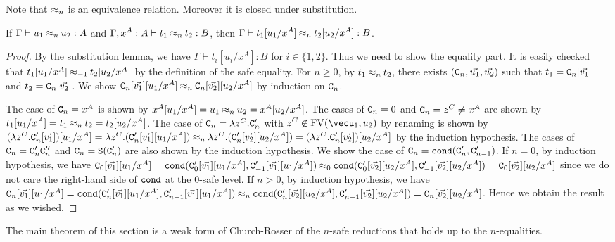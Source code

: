 Note that $\mathbin{\approx_{n}}$ is an equivalence relation. Moreover it is closed under substitution. 
\begin{lemma}\label{lem:nequal_subst}
  If $\Gamma \vdash u_1 \mathbin{\approx_{n}} u_2:A$ and $\Gamma, x^A:A \vdash t_1 \mathbin{\approx_{n}} t_2:B$, then
  $\Gamma \vdash t_1[u_1/x^A] \mathbin{\approx_{n}} t_2[u_2/x^A] :B$. 
\end{lemma}
\begin{proof}
  By the substitution lemma, we have $\Gamma \vdash t_i[u_i/x^A]: B$ for $i\in\{1,2\}$.
  Thus we need to show the equality part. 
  It is easily checked that $t_1[u_1/x^A] \mathbin{\approx_{-1}} t_2[u_2/x^A]$ by the definition of the safe equality.
  For $n\ge 0$, by $t_1\mathbin{\approx_{n}} t_2$, there exists $({\tt C}_{n},\vec{u_1},\vec{u_2})$ such that
  $t_1 = {\tt C}_{n}[\vec{v_1}]$ and $t_2 = {\tt C}_{n}[\vec{v_2}]$.
  We show ${\tt C}_{n}[\vec{v_1}][u_1/x^A] \mathbin{\approx_{n}} {\tt C}_{n}[\vec{v_2}][u_2/x^A]$ by induction on ${\tt C}_{n}$. 

  The case of ${\tt C}_{n}=x^A$ is shown by $x^A[u_1/x^A] = u_1 \mathbin{\approx_{n}} u_2 = x^A[u_2/x^A]$.
  The cases of ${\tt C}_{n}=0$ and ${\tt C}_{n}=z^C \neq x^A$
  are shown by $t_1[u_1/x^A] = t_1 \mathbin{\approx_{n}} t_2 = t_2[u_2/x^A]$.
  The case of ${\tt C}_{n}=\lambda z^C.{\tt C}_{n}'$ with $z^C\not\in\FV(\vecu_1,u_2)$ by renaming
  is shown by
  $(\lambda z^C.{\tt C}_{n}'[\vec{v_1}])[u_1/x^A] = \lambda z^C.({\tt C}_{n}'[\vec{v_1}][u_1/x^A]) \mathbin{\approx_{n}} \lambda z^C.({\tt C}_{n}'[\vec{v_2}][u_2/x^A]) = (\lambda z^C.{\tt C}_{n}'[\vec{v_2}])[u_2/x^A]$ by the induction hypothesis.
  The cases of ${\tt C}_{n}={\tt C}_{n}'{\tt C}_{n}''$ and ${\tt C}_{n}={\tt S}({\tt C}_{n}')$
  are also shown by the induction hypothesis.
  We show the case of ${\tt C}_{n}={\tt cond}({\tt C}_{n}',{\tt C}_{n-1}')$.
  If $n=0$, by induction hypothesis, we have ${\tt C}_{0}[\vec{v_1}][u_1/x^A] = {\tt cond}({\tt C}_{0}'[\vec{v_1}][u_1/x^A],{\tt C}_{-1}'[\vec{v_1}][u_1/x^A]) \mathbin{\approx_{0}} {\tt cond}({\tt C}_{0}'[\vec{v_2}][u_2/x^A],{\tt C}_{-1}'[\vec{v_2}][u_2/x^A]) = {\tt C}_{0}[\vec{v_2}][u_2/x^A]$ since we do not care the right-hand side of ${\tt cond}$ at the $0$-safe level. 
  If $n>0$, by induction hypothesis, we have ${\tt C}_{n}[\vec{v_1}][u_1/x^A] = {\tt cond}({\tt C}_{n}'[\vec{v_1}][u_1/x^A],{\tt C}_{n-1}'[\vec{v_1}][u_1/x^A]) \mathbin{\approx_{n}} {\tt cond}({\tt C}_{n}'[\vec{v_2}][u_2/x^A],{\tt C}_{n-1}'[\vec{v_2}][u_2/x^A]) = {\tt C}_{n}[\vec{v_2}][u_2/x^A]$.
  Hence we obtain the result as we wished. 
\end{proof}


The main theorem of this section is a weak form of Church-Rosser
of the $n$-safe reductions that holds up to the $n$-equalities. 

